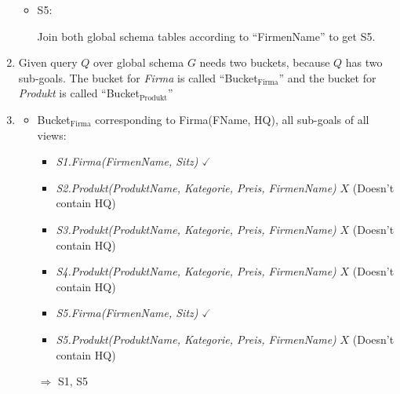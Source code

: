 \documentclass{scrartcl}
\begin{document}
\begin{enumerate}
\begin{itemize}
			\item S5:
			\begin{center}
			\end{center}
			Join both global schema tables according to \enquote{FirmenName} to get S5.
		\end{itemize}
		
		\item
		Given query $Q$ over global schema $G$ needs two buckets, because $Q$ has two sub-goals.
		The bucket for \textit{Firma} is called \enquote{Bucket$_\text{Firma}$} and the bucket for \textit{Produkt} is called \enquote{Bucket$_\text{Produkt}$}
		
		\item\phantom{phantom}
		\begin{itemize}
			\item Bucket$_\text{Firma}$ corresponding to Firma(FName, HQ), all sub-goals of all views:
			\begin{itemize}
				\item \textit{S1.Firma(FirmenName, Sitz)} $\checked$
				\item \textit{S2.Produkt(ProduktName, Kategorie, Preis, FirmenName)} $X$ (Doesn't contain HQ)
				\item \textit{S3.Produkt(ProduktName, Kategorie, Preis, FirmenName)} $X$ (Doesn't contain HQ)
				\item \textit{S4.Produkt(ProduktName, Kategorie, Preis, FirmenName)} $X$ (Doesn't contain HQ)
				\item \textit{S5.Firma(FirmenName, Sitz)} $\checked$
				\item \textit{S5.Produkt(ProduktName, Kategorie, Preis, FirmenName)} $X$ (Doesn't contain HQ)
			\end{itemize}
			$\Rightarrow$ S1, S5
			

\end{itemize}
\end{enumerate}
\end{document}
